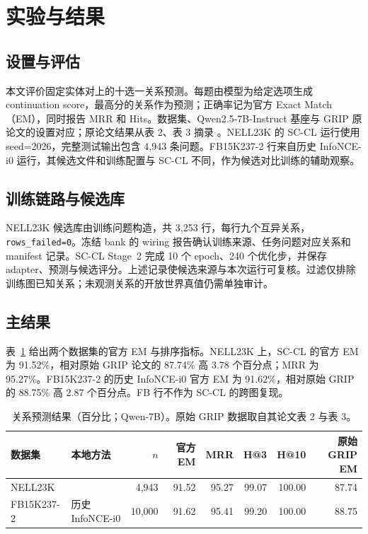 \section{实验与结果}

\subsection{设置与评估}

本文评价固定实体对上的十选一关系预测。每题由模型为给定选项生成 continuation score，最高分的关系作为预测；正确率记为官方 Exact Match（EM），同时报告 MRR 和 Hits。数据集、Qwen2.5-7B-Instruct 基座与 GRIP 原论文的设置对应；原论文结果从表 2、表 3 摘录 \citep{feng2025grip}。NELL23K 的 SC-CL 运行使用 seed=2026，完整测试输出包含 4,943 条问题。FB15K237-2 行来自历史 InfoNCE-i0 运行，其候选文件和训练配置与 SC-CL 不同，作为候选对比训练的辅助观察。

\subsection{训练链路与候选库}

NELL23K 候选库由训练问题构造，共 3,253 行，每行九个互异关系，\texttt{rows\_failed=0}。冻结 bank 的 wiring 报告确认训练来源、任务问题对应关系和 manifest 记录。SC-CL Stage~2 完成 10 个 epoch、240 个优化步，并保存 adapter、预测与候选评分。上述记录使候选来源与本次运行可复核。过滤仅排除训练图已知关系；未观测关系的开放世界真值仍需单独审计。

\subsection{主结果}

表~\ref{tab:student-main} 给出两个数据集的官方 EM 与排序指标。NELL23K 上，SC-CL 的官方 EM 为 91.52\%，相对原始 GRIP 论文的 87.74\% 高 3.78 个百分点；MRR 为 95.27\%。FB15K237-2 的历史 InfoNCE-i0 官方 EM 为 91.62\%，相对原始 GRIP 的 88.75\% 高 2.87 个百分点。FB 行不作为 SC-CL 的跨图复现。

\begin{table}[t]
\caption{关系预测结果（百分比；Qwen-7B）。原始 GRIP 数据取自其论文表 2 与表 3。}
\label{tab:student-main}
\centering\scriptsize
\begin{tabular}{llrrrrrr}
\toprule
数据集 & 本地方法 & $n$ & 官方 EM & MRR & H@3 & H@10 & 原始 GRIP EM \\
\midrule
NELL23K & \scc-9 & 4,943 & 91.52 & 95.27 & 99.07 & 100.00 & 87.74 \\
FB15K237-2 & 历史 InfoNCE-i0 & 10,000 & 91.62 & 95.41 & 99.20 & 100.00 & 88.75 \\
\bottomrule
\end{tabular}
\end{table}

